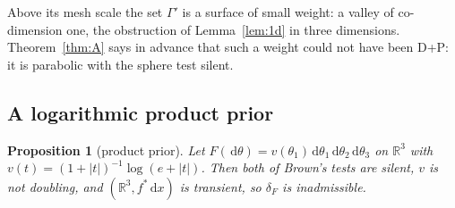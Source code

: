 \documentclass[11pt]{amsart}
\newcommand{\R}{\mathbb{R}}
\newcommand{\dd}{\,\mathrm{d}}
\newcommand{\abs}[1]{\lvert #1\rvert}
\theoremstyle{plain}
\newtheorem{proposition}[theorem]{Proposition}
\theoremstyle{definition}
\theoremstyle{remark}
\begin{document}
Above its mesh scale the set $\Gamma'$ is a surface of small weight: a valley of
co-dimension one, the obstruction of Lemma~\ref{lem:1d} in three dimensions.
Theorem~\ref{thm:A} says in advance that such a weight could not have been D+P:
it is parabolic with the sphere test silent.

\subsection{A logarithmic product prior}
\begin{proposition}[product prior]\label{prop:log}
Let $F(\dd\theta)=v(\theta_1)\dd\theta_1\dd\theta_2\dd\theta_3$ on $\R^3$ with
$v(t)=(1+\abs t)^{-1}\log(e+\abs t)$. Then both of Brown's tests are silent,
$v$ is not doubling, and $(\R^3,f^*\dd x)$ is transient, so $\delta_F$ is
inadmissible.
\end{proposition}
\end{document}
